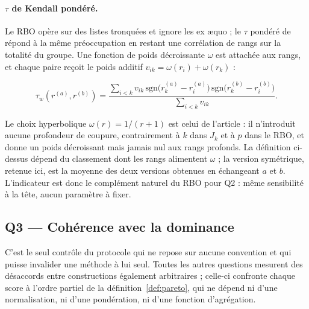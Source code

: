\documentclass[11pt,a4paper]{article}
\theoremstyle{definition}
\theoremstyle{remark}
\begin{document}
\bigskip

\paragraph{$\tau$ de Kendall pondéré.} Le RBO opère sur des listes tronquées et ignore les
ex \ae quo ; le $\tau$ pondéré de \citet{vigna2015} répond à la même préoccupation en
restant une corrélation de rangs sur la totalité du groupe. Une fonction de poids
décroissante $\omega$ est attachée aux rangs, et chaque paire reçoit le poids additif
$v_{ik} = \omega(r_i) + \omega(r_k)$ :

\medskip

\[
  \tau_w(r^{(a)}, r^{(b)}) =
  \frac{\sum_{i<k} v_{ik}\,
        \mathrm{sgn}\big(r^{(a)}_k - r^{(a)}_i\big)\,
        \mathrm{sgn}\big(r^{(b)}_k - r^{(b)}_i\big)}
       {\sum_{i<k} v_{ik}} .
\]

\bigskip

Le choix hyperbolique $\omega(r) = 1/(r+1)$ est celui de l'article : il n'introduit aucune
profondeur de coupure, contrairement à $k$ dans $J_k$ et à $p$ dans le RBO, et donne un
poids décroissant mais jamais nul aux rangs profonds. La définition ci-dessus dépend du
classement dont les rangs alimentent $\omega$ ; la version symétrique, retenue ici, est la
moyenne des deux versions obtenues en échangeant $a$ et $b$. L'indicateur est donc le
complément naturel du RBO pour Q2 : même sensibilité à la tête, aucun paramètre à fixer.

\bigskip

\subsection{Q3 --- Cohérence avec la dominance}
\label{sec:q3}

\medskip

C'est le seul contrôle du protocole qui ne repose sur aucune convention et qui puisse
invalider une méthode à lui seul. Toutes les autres questions mesurent des désaccords entre
constructions également arbitraires ; celle-ci confronte chaque score à l'ordre partiel de
la définition~\ref{def:pareto}, qui ne dépend ni d'une normalisation, ni d'une pondération,
ni d'une fonction d'agrégation.

\medskip
\end{document}
